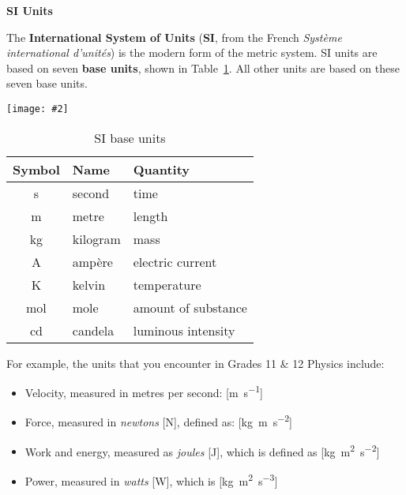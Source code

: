 \documentclass{../../oss-handout}
\newcommand{\pic}[2]{\texttt{[image: \#2]}}
\begin{document}
\begin{center}
  \textbf{SI Units}
\end{center}
The \textbf{International System of Units} (\textbf{SI}, from the French
\emph{Syst\`{e}me international d'unit\'{e}s}) is the modern form of the metric
system. SI units are based on seven \textbf{base units}, shown in
Table~\ref{tabl:si}. All other units are based on these seven base units.
\begin{table}[ht]
  \centering
  \begin{minipage}{.3\linewidth}
    \centering
    \pic{1}{../graphics/si-base}
  \end{minipage}
  \hspace{.3in}
  \begin{tabular}{c|l|l}
    \rowcolor{pink}
    \textbf{Symbol} & \textbf{Name} & \textbf{Quantity} \\ \hline
    \si{\second}    & second  & time\\
    \si{\metre}     & metre   & length\\
    \si{\kilo\gram} & kilogram & mass\\
    \si{\ampere}    & amp\`{e}re  & electric current\\
    \si{\kelvin}    & kelvin  & temperature\\
    \si{\mol}       & mole    & amount of substance\\
    \si{\candela}   & candela & luminous intensity
  \end{tabular}
  \caption{SI base units}
  \label{tabl:si}
\end{table}

For example, the units that you encounter in Grades 11 \& 12 Physics include:
\begin{itemize}[noitemsep,topsep=0pt,leftmargin=12pt]
\item Velocity, measured in metres per second: [\si{\metre\per\second}]
\item Force, measured in \emph{newtons} [\si{\newton}], defined as:
  [\si{\kilo\gram.\metre\per\second^2}]
\item Work and energy, measured as \emph{joules} [\si{\joule}], which is defined
  as [\si{\kilo\gram.\metre^2\per\second^2}]
\item Power, measured in \emph{watts} [\si{\watt}], which is
  [\si{\kilo\gram.\metre^2\per\second^3}]
\end{itemize}
\end{document}
